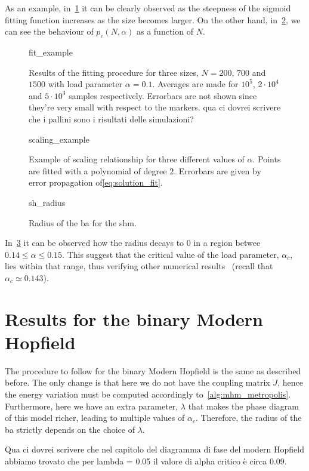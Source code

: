 \documentclass[\rootdir/main.tex]{subfiles}
\begin{document}
As an example, in~\cref{fig:sh_fit_example} it can be clearly observed as the steepness of the sigmoid fitting function increases as the size becomes larger. On the other hand, in~\cref{fig:sh:scaling_example}, we can see the behaviour of $p_c(N, \alpha)$ as a function of $N$.
\begin{figure}[hbt]
    \centering
    {fit_example}
    \caption{Results of the fitting procedure for three sizes, $N = 200,\, 700$ and $1500$ with load parameter $\alpha = 0.1$. Averages are made for $10^5$, $2\cdot 10^4$ and $5\cdot10^3$ samples respectively. Errorbars are not shown since they're very small with respect to the markers. qua ci dovrei scrivere che i pallini sono i risultati delle simulazioni?}
    \label{fig:sh_fit_example}
\end{figure}
\begin{figure}
    \centering
    {scaling_example}
    \caption{Example of scaling relationship for three different values of $\alpha$. Points are fitted with a polynomial of degree $2$. Errorbars are given by error propagation of\cref{eq:solution_fit}.}
    \label{fig:sh:scaling_example}
\end{figure}
\begin{figure}
    \centering
    {sh_radius}
    \caption{Radius of the \acrlong{ba} for the \acrlong{shm}.}
    \label{fig:sh_radius}
\end{figure}
In~\cref{fig:sh_radius} it can be observed how the radius decays to $0$ in a region betwee $0.14 \leq \alpha \leq 0.15$. This suggest that the critical value of the load parameter, $\alpha_c$, lies within that range, thus verifying other numerical results~\cite{amit_phase, another_mc_study} (recall that $\alpha_c \simeq 0.143$).

\clearpage
\section{Results for the binary Modern Hopfield}
The procedure to follow for the binary Modern Hopfield is the same as described before. The only change is that here we do not have the coupling matrix $J$, hence the energy variation must be computed accordingly to~\cref{alg:mhm_metropolis}.
Furthermore, here we have an extra parameter, $\lambda$ that makes the phase diagram of this model richer, leading to multiple values of $\alpha_c$. Therefore, the radius of the \acrlong{ba} strictly depends on the choice of $\lambda$.

Qua ci dovrei scrivere che nel capitolo del diagramma di fase del modern Hopfield abbiamo trovato che per lambda = 0.05 il valore di alpha critico è circa 0.09.
\end{document}
